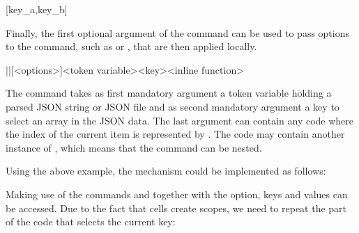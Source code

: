 \documentclass[a4paper]{article}
\begin{document}
{{\begin{codeexamplecolumns}
[key_a,key_b]
  {\myJSONitem}
\end{codeexamplecolumns}

Finally, the first optional argument of the command can be used to pass options to the command, such as  or , that are then applied locally.

\begin{macrodef}
|\JSONParseArrayMapInline|[<options>]{<token variable>}{<key>}{<inline function>}
\end{macrodef}
The command \macro{\JSONParseArrayMapInline} takes as first mandatory argument a token variable holding a parsed JSON string or JSON file and as second mandatory argument a key to select an array in the JSON data. The last argument can contain any code where the index of the current item is represented by . The code may contain another instance of \macro{\JSONParseArrayMapInline}, which means that the command can be nested.

Using the above example, the mechanism could be implemented as follows:

\begin{codeexamplecolumns}
\end{codeexamplecolumns}

Making use of the commands \macro{\JSONParseKeys} and \macro{\JSONParseValue} together with the  option, keys and values can be accessed. Due to the fact that cells create scopes, we need to repeat the part of the code that selects the current key:

}}
\end{document}
